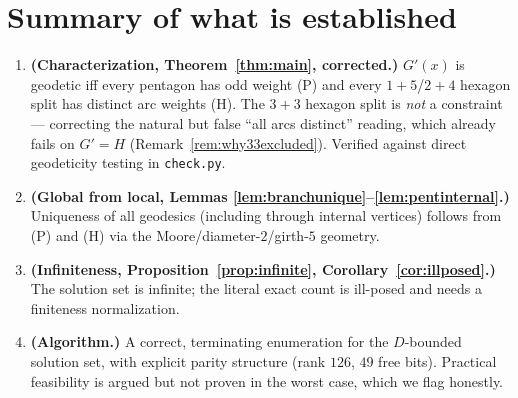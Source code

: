 \documentclass{amsart}
\theoremstyle{definition}
\begin{document}
\section{Summary of what is established}

\begin{enumerate}
\item \textbf{(Characterization, Theorem~\ref{thm:main}, corrected.)} $G'(x)$ is
geodetic iff every pentagon has odd weight (P) and every $1{+}5$/$2{+}4$ hexagon
split has distinct arc weights (H). The $3{+}3$ hexagon split is \emph{not} a
constraint --- correcting the natural but false ``all arcs distinct'' reading,
which already fails on $G'=H$ (Remark~\ref{rem:why33excluded}). Verified against
direct geodeticity testing in \texttt{check.py}.
\item \textbf{(Global from local, Lemmas
\ref{lem:branchunique}--\ref{lem:pentinternal}.)} Uniqueness of all geodesics
(including through internal vertices) follows from (P) and (H) via the
Moore/diameter-$2$/girth-$5$ geometry.
\item \textbf{(Infiniteness, Proposition~\ref{prop:infinite},
Corollary~\ref{cor:illposed}.)} The solution set is infinite; the literal exact
count is ill-posed and needs a finiteness normalization.
\item \textbf{(Algorithm.)} A correct, terminating enumeration for the
$D$-bounded solution set, with explicit parity structure (rank $126$, $49$ free
bits). Practical feasibility is argued but not proven in the worst case, which we
flag honestly.
\end{enumerate}
\end{document}
